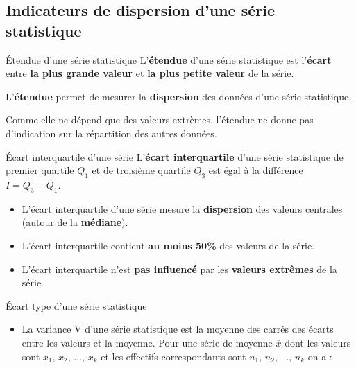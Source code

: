 \begin{pageCours} %


\section{Indicateurs de dispersion d'une série statistique}

\begin{DefT}{Étendue d'une série statistique}
L'\textbf{étendue} d'une série statistique est l'\textbf{écart} entre \textbf{la plus grande valeur} et \textbf{la plus petite valeur} de la série.
\end{DefT}

\begin{Rq}
L'\textbf{étendue} permet de mesurer la \textbf{dispersion} des données d'une série statistique.

Comme elle ne dépend que des valeurs extrèmes, l'étendue ne donne pas d'indication sur la répartition des autres données.
\end{Rq}

\begin{DefT}{Écart interquartile d'une série}
L'\textbf{écart interquartile} d'une série statistique de premier quartile $Q_1$ et de troisième quartile $Q_3$ est égal à la différence $I=Q_3-Q_1$.
\end{DefT}

\begin{Rqs}
\begin{itemize}
\item L'écart interquartile d'une série mesure la \textbf{dispersion} des valeurs centrales (autour de la \textbf{médiane}).
\item L'écart interquartile contient \textbf{au moins 50\%} des valeurs de la série.
\item L'écart interquartile n'est \textbf{pas influencé} par les \textbf{valeurs extrêmes} de la série.
\end{itemize}
\end{Rqs}

\begin{DefT}{Écart type d'une série statistique}
\begin{itemize}
\item La variance V d'une série statistique est la moyenne des carrés des écarts entre les valeurs et la moyenne. Pour une série de moyenne $\overline{x}$ dont les valeurs sont $x_1,\,x_2,\,\ldots,\,x_k$ et les effectifs correspondants sont $n_1,\,n_2,\,\ldots,\,n_k$ on a : 


\end{itemize}
\end{DefT}
\end{pageCours}
